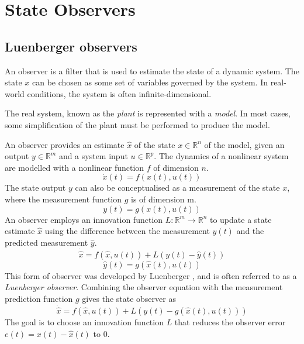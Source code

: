\section{State Observers} \label{sec:observerequations}
\subsection{Luenberger observers}
An observer is a filter that is used to estimate the state of a dynamic system. The state $x$ can be chosen as some set of variables governed by the system. In real-world conditions, the system is often infinite-dimensional.

The real system, known as the \textit{plant} is represented with a \textit{model}. In most cases, some simplification of the plant must be performed to produce the model.

An observer provides an estimate $\hat{x}$ of the state $x \in \mathbb{R}^n$ of the model, given an output $y \in \mathbb{R}^m$ and a system input $u \in \mathbb{R}^p$. The dynamics of a nonlinear system are modelled with a nonlinear function $f$ of dimension $n$.
\begin{equation}
	\dot{x}(t) = f(x(t),u(t))
\end{equation}
The state output $y$ can also be conceptualised as a measurement of the state $x$, where the measurement function $g$ is of dimension m.
\begin{equation}
	y(t) = g(x(t),u(t))
\end{equation}
An observer employs an innovation function $L: \mathbb{R}^m \rightarrow \mathbb{R}^n$ to update a state estimate $\hat{x}$ using the difference between the measurement $y(t)$ and the predicted measurement $\hat{y}$.
\begin{equation} \label{eq:observerfunction}
	\dot{\hat{x}} = f(\hat{x},u(t)) + L(y(t)-\hat{y}(t))
\end{equation}
\begin{equation}
	\hat{y}(t) = g(\hat{x}(t),u(t)) 
\end{equation}
This form of observer was developed by Luenberger \cite{luenberger1966observers}, and is often referred to as a \textit{Luenberger observer}. Combining the observer equation with the measurement prediction function $g$ gives the state observer as
\begin{equation}
	\dot{\hat{x}} = f(\hat{x},u(t)) + L(y(t)-g(\hat{x}(t),u(t)))
\end{equation}
The goal is to choose an innovation function $L$ that reduces the observer error $e(t) = x(t) - \hat{x}(t)$ to 0.

